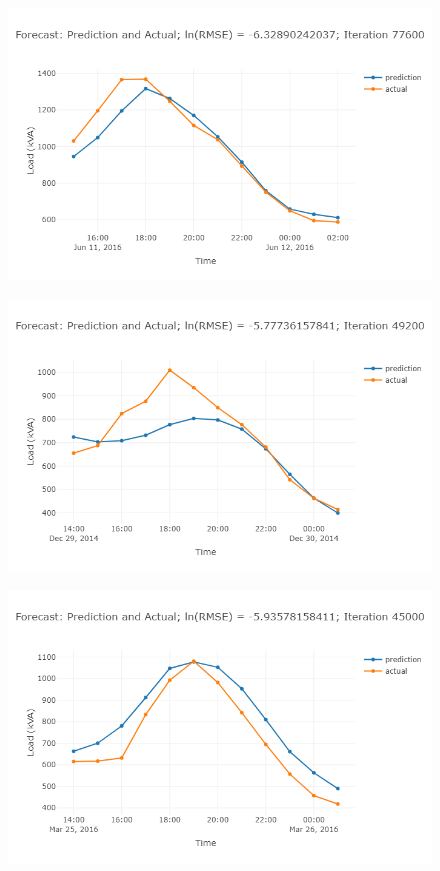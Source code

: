 \begin{figure}
\centering
\includegraphics[width=0.95\linewidth]{"images/prelim-plots/newplot (2)"}
\caption{}
\end{figure}

\begin{figure}
\centering
\includegraphics[width=0.95\linewidth]{"images/prelim-plots/newplot (3)"}
\caption{}
\end{figure}

\begin{figure}
\centering
\includegraphics[width=0.95\linewidth]{"images/prelim-plots/newplot (4)"}
\caption{}
\end{figure}


